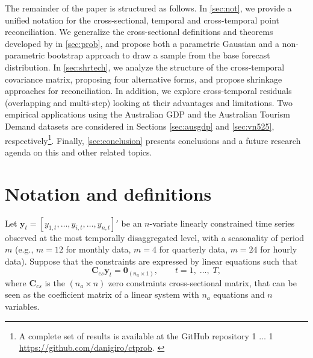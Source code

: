 \documentclass[a4paper,11pt]{article}
\newcommand{\blind}{1}
\newcommand{\yvet}{\bm{y}}
\newcommand{\Cvet}{\bm{C}}
\newcommand{\Zerovet}{\bm{0}}
\newcommand{\githuburl}{\begingroup%
\if0\blind
{
$\dots$
}\fi
\if1\blind
{
\url{https://github.com/danigiro/ctprob}.
}\fi
\endgroup}
\theoremstyle{definition}
\begin{document}
The remainder of the paper is structured as follows. In \autoref{sec:not}, we provide a unified notation for the cross-sectional, temporal and cross-temporal point reconciliation. We generalize the cross-sectional definitions and theorems developed by \cite{panagiotelis2023} in \autoref{sec:prob}, and propose both a parametric Gaussian and a non-parametric bootstrap approach to draw a sample from the base forecast distribution. In \autoref{sec:shrtech}, we analyze the structure of the cross-temporal covariance matrix, proposing four alternative forms, and propose shrinkage approaches for reconciliation. In addition, we explore cross-temporal residuals (overlapping and multi-step) looking at their advantages and limitations. %
Two empirical applications using the Australian GDP and the Australian Tourism Demand datasets are considered in Sections \ref{sec:ausgdp} and \ref{sec:vn525}, respectively\footnote{A complete set of results is available at the GitHub repository \githuburl}. Finally, \autoref{sec:conclusion} presents conclusions and a future research agenda on this and other related topics.


\section{Notation and definitions}\label{sec:not}

Let $\yvet_t = [y_{1,t},\dots,y_{i,t},\dots,y_{n,t}]'$ be an $n$-variate linearly constrained time series observed at the most temporally disaggregated level, with a seasonality of period $m$ (e.g., $m = 12$ for monthly data, $m = 4$ for quarterly data, $m = 24$ for hourly data). Suppose that the constraints are expressed by linear equations such that \citep{difonzo2023}
\begin{equation}
	\label{eq:cs_con}
	\Cvet_{cs}\yvet_t = \Zerovet_{(n_a \times 1)}, \qquad t = 1, \;\dots, \;T,
\end{equation}
where $\Cvet_{cs}$ is the $(n_a \times n)$ zero constraints cross-sectional matrix, that can be seen as the coefficient matrix of a linear system with $n_a$ equations and $n$ variables.


\end{document}
